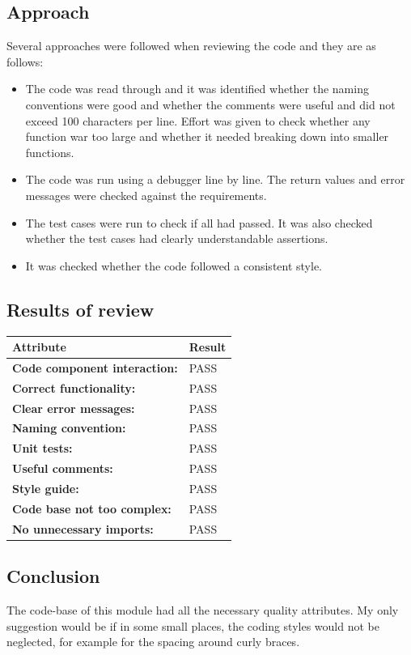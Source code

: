 \documentclass[paper=a4, fontsize=11pt,twoside]{scrartcl}	%
\begin{document}
    \subsection{Approach}
    Several approaches were followed when reviewing the code and they are as follows:
    \begin{itemize}
        \item The code was read through and it was identified whether the naming conventions were good and whether the comments were useful and did not exceed 100 characters per line. Effort was given to check whether any function war too large and whether it needed breaking down into smaller functions.
        \item The code was run using a debugger line by line. The return values and error messages were checked against the requirements.
        \item The test cases were run to check if all had passed. It was also checked whether the test cases had clearly understandable assertions. 
        \item It was checked whether the code followed a consistent style.
    \end{itemize}
    \subsection{Results of review}
    \begin{tabular}{ |p{7cm} | p{7cm}| }
     \hline
     \textbf{Attribute} & \textbf{Result}\\
     \hline
     \textbf{Code component interaction:} & PASS\\
     \textbf{Correct functionality:} & PASS\\
     \textbf{Clear error messages:} & PASS\\
     \textbf{Naming convention:} & PASS\\
     \textbf{Unit tests:} & PASS\\
     \textbf{Useful comments:} & PASS\\
     \textbf{Style guide:} & PASS\\
     \textbf{Code base not too complex:} & PASS\\
     \textbf{No unnecessary imports:} & PASS\\
     \hline
    \end{tabular}
    
    \subsection{Conclusion}
    The code-base of this module had all the necessary quality attributes. My only suggestion would be if in some small places, the coding styles would not be neglected, for example for the spacing around curly braces.
    
\end{document}
